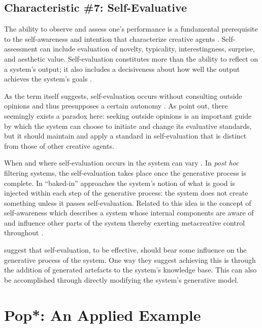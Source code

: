\documentclass[phd,electronic,oneside,twosidetoc,letterpaper,chaptercenter,parttop,lof,lot]{byumsphd}
\begin{document}
\subsection{Characteristic \#7: Self-Evaluative}

The ability to observe and assess one's performance is a fundamental prerequisite to the self-awareness and intention that characterize creative agents \citep{Ackerman2017TeachingCreativity}. Self-assessment can include evaluation of novelty, typicality, interestingness, surprise, and aesthetic value. Self-evaluation constitutes more than the ability to reflect on a system's output; it also includes a decisiveness about how well the output achieves the system's goals \citep{Ventura2016}.

As the term itself suggests, self-evaluation occurs without consulting outside opinions and thus presupposes a certain autonomy \citep{Jennings2010DevelopingIntelligence}. As \citeauthor{Ackerman2017TeachingCreativity} \cite{Ackerman2017TeachingCreativity} point out, there seemingly exists a paradox here: seeking outside opinions is an important guide by which the system can choose to initiate and change its evaluative standards, but it should maintain and apply a standard in self-evaluation that is distinct from those of other creative agents.

When and where self-evaluation occurs in the system can vary \citep{Ventura2016}. In \textit{post hoc} filtering systems, the self-evaluation takes place once the generative process is complete. In ``baked-in'' approaches the system's notion of what is good is injected within each step of the generative process: the system does not create something unless it passes self-evaluation. Related to this idea is the concept of self-awareness which describes a system whose internal components are aware of and influence other parts of the system thereby exerting metacreative control throughout \citep{linkola2017aspects}.

\citeauthor{perez2004three} \cite{perez2004three} suggest that self-evaluation, to be effective, should bear some influence on the generative process of the system. One way they suggest achieving this is through the addition of generated artefacts to the system's knowledge base. This can also be accomplished through directly modifying the system's generative model.

\section{Pop*: An Applied Example}
\end{document}
